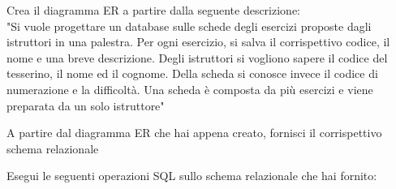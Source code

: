 \documentclass[addpoints]{exam}
\begin{document}
 
 
\vspace{5mm}
 
 
\vspace{5mm}
 
 
\begin{questions}
\question[3] Crea il diagramma ER a partire dalla seguente descrizione:\\ "Si vuole progettare un database sulle schede degli esercizi proposte dagli istruttori in una palestra. Per ogni esercizio, si salva il corrispettivo codice, il nome e una breve descrizione. Degli istruttori si vogliono sapere il codice del tesserino, il nome ed il cognome. Della scheda si conosce invece il codice di numerazione e la difficoltà. Una scheda è composta da più esercizi e viene preparata da un solo istruttore"

\question[2] A partire dal diagramma ER che hai appena creato, fornisci il corrispettivo schema relazionale

\question Esegui le seguenti operazioni SQL sullo schema relazionale che hai fornito:



 
\end{questions}

\begin{center}
	\gradetable[h][questions]
\end{center}
\end{document}

